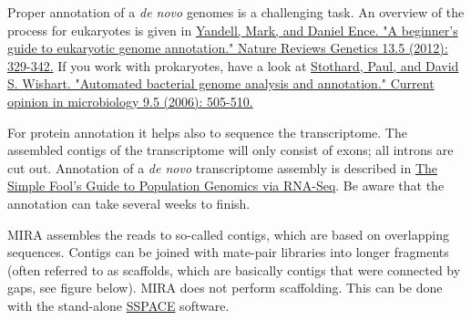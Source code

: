 \documentclass[11pt]{article}
\begin{document}
Proper annotation of a \emph{de novo} genomes is a challenging task. An
overview of the process for eukaryotes is given in
\href{http://www.marcottelab.org/users/BIO337_2014/EukGeneAnnotation.pdf}{Yandell, Mark, and Daniel Ence. "A beginner's guide to eukaryotic genome annotation." Nature Reviews Genetics 13.5 (2012): 329-342.}
If you work with prokaryotes, have a look at \href{http://stothard.afns.ualberta.ca/public_html/papers/curr_opin_microbiol_bacterial_annotation.pdf}{Stothard, Paul, and David S. Wishart. "Automated bacterial genome analysis and annotation." Current opinion in microbiology 9.5 (2006): 505-510.}

For protein annotation it helps also to sequence the
transcriptome. The assembled contigs of the transcriptome will only
consist of exons; all introns are cut out. Annotation of a \emph{de novo}
transcriptome assembly is described in \href{http://sfg.stanford.edu/BLAST.html}{The Simple Fool's Guide to
Population Genomics via RNA-Seq}. Be aware that the annotation can take several weeks to finish.

MIRA assembles the reads to so-called contigs, which are based on
overlapping sequences. Contigs can be joined with mate-pair libraries
into longer fragments (often referred to as scaffolds, which are
basically contigs that were connected by gaps, see figure below). MIRA
does not perform scaffolding. This can be done with the stand-alone
\href{http://www.baseclear.com/genomics/bioinformatics/basetools/SSPACE}{SSPACE} software.
\end{document}

